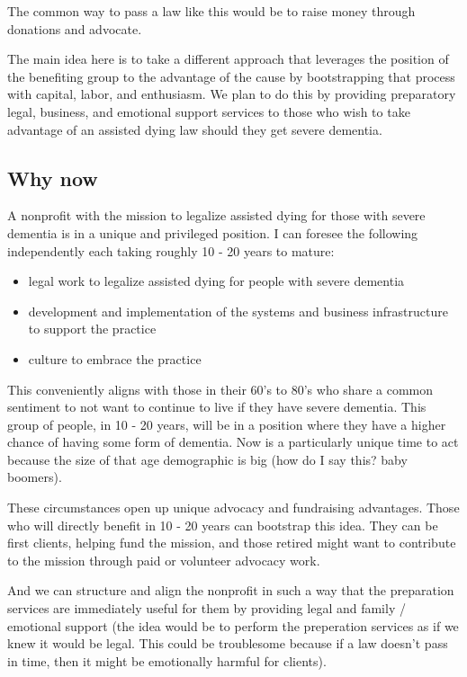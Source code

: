 \documentclass{proposalnsf}
\begin{document}
The common way to pass a law like this would be to raise money through donations and advocate.

The main idea here is to take a different approach that leverages the position of the benefiting group to the advantage of the cause by bootstrapping that process with capital, labor, and enthusiasm. We plan to do this by providing preparatory legal, business, and emotional support services to those who wish to take advantage of an assisted dying law should they get severe dementia.

\subsection{Why now}
A nonprofit with the mission to legalize assisted dying for those with severe dementia is in a unique and privileged position. I can foresee the following independently each taking roughly 10 - 20 years to mature:

      \begin{itemize}
          \item{legal work to legalize assisted dying for people with severe dementia}
          \item{development and implementation of the systems and business infrastructure to support the practice}
          \item{culture to embrace the practice}
      \end{itemize}


This conveniently aligns with those in their 60's to 80's who share a common sentiment to not want to continue to live if they have severe dementia. This group of people, in 10 - 20 years, will be in a position where they have a higher chance of having some form of dementia. Now is a particularly unique time to act because the size of that age demographic is big (how do I say this? baby boomers).

These circumstances open up unique advocacy and fundraising advantages. Those who will directly benefit in 10 - 20 years can bootstrap this idea. They can be first clients, helping fund the mission, and those retired might want to contribute to the mission through paid or volunteer advocacy work.

And we can structure and align the nonprofit in such a way that the preparation services are immediately useful for them by providing legal and family / emotional support (the idea would be to perform the preperation services as if we knew it would be legal. This could be troublesome because if a law doesn't pass in time, then it might be emotionally harmful for clients).
\end{document}
